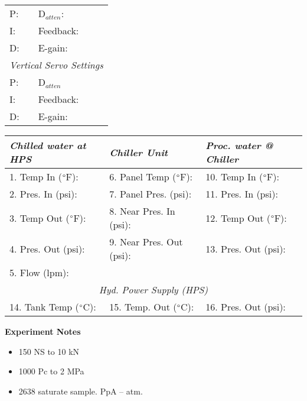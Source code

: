 \documentclass[letterpaper, 10pt]{article}
\begin{document}
\begin{table}[!ht]
        \footnotesize
        \renewcommand{\arraystretch}{1.1}
        \begin{tabular}{ p{1cm}|p{2cm} } \rowcolor[HTML]{EFEFEF}
            \multicolumn{2}{c}{\textit{Horizontal Servo Settings} \cellcolor[HTML]{EFEFEF}} \\ \hline P:  & D$_{atten}$:  \\ \hline
        I:  & Feedback:  \\ \hline 
        D:  & E-gain:  \\ \hline 
        \multicolumn{2}{c}{\textit{Vertical Servo Settings} \cellcolor[HTML]{EFEFEF}} \\ \hline 
        P:  & D$_{atten}$   \\ \hline 
        I:  & Feedback:  \\ \hline
        D:  & E-gain:  \\ \hline 
    \end{tabular} \hfill 
        \renewcommand{\arraystretch}{1.1}
        \begin{tabular}{ l|l|l } \rowcolor[HTML]{EFEFEF}
        \textit{Chilled water at HPS} & \textit{Chiller Unit} & \textit{Proc. water @ Chiller} \\ \hline 1. Temp In ($\degree$F):  & 6. Panel Temp ($\degree$F):  & 10. Temp In ($\degree$F):  \\ \hline 
    2. Pres. In (psi):  & 7. Panel Pres. (psi):  & 11. Pres. In (psi):  \\ \hline 
    3. Temp Out ($\degree$F):  & 8. Near Pres. In (psi): & 12. Temp Out ($\degree$F):  \\ \hline 
    4. Pres. Out (psi): & 9. Near Pres. Out (psi): & 13. Pres. Out (psi):  \\ \hline 
    5. Flow (lpm):  \\ \hline 
    \multicolumn{3}{c}{\textit{Hyd. Power Supply (HPS)} \cellcolor[HTML]{EFEFEF}} \\ \hline 
    14. Tank Temp ($\degree$C):  & 15. Temp. Out ($\degree$C):  & 16. Pres. Out (psi):  \\ \hline 
    \end{tabular} 
    \end{table} \vspace{-0.5cm} 

\newpage 
 \textbf{Experiment Notes}
 \medskip
 {\small \begin{itemize}[label=\#]
 \setlength\itemsep{0.25em}
 	 \item 150 NS to 10 kN
 	 \item 1000 Pc to 2 MPa
 	 \item 2638 saturate sample. PpA -- atm.
 \end{itemize}} 

 
\end{document}
